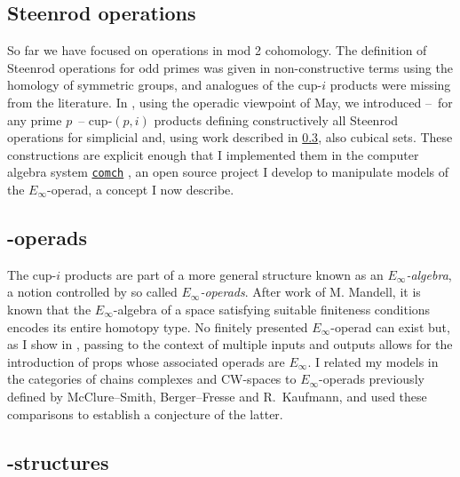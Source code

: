 \subsection{Steenrod operations} \label{ss:may steenrod}

So far we have focused on operations in mod 2 cohomology.
The definition of Steenrod operations for odd primes was given in non-constructive terms using the homology of symmetric groups, and analogues of the cup-$i$ products were missing from the literature.
In \cite{medina2021may_st}, using the operadic viewpoint of May, we introduced --~for any prime $p$~-- cup-$(p,i)$ products defining constructively all Steenrod operations for simplicial and, using work described in \cref{ss:e-infty structures}, also cubical sets.
These constructions are explicit enough that I implemented them in the computer algebra system \href{https://comch.readthedocs.io/en/latest/}{\texttt{comch}} \cite{medina2021comch}, an open source project I develop to manipulate models of the $E_\infty$-operad, a concept I now describe.

\subsection{\pdfEinfty-operads}

The cup-$i$ products are part of a more general structure known as an \textit{$E_\infty$-algebra}, a notion controlled by so called \textit{$E_\infty$-operads}.
After work of M. Mandell, it is known that the $E_\infty$-algebra of a space satisfying suitable finiteness conditions encodes its entire homotopy type.
No finitely presented $E_\infty$-operad can exist but, as I show in \cite{medina2020prop1,medina2021prop2}, passing to the context of multiple inputs and outputs allows for the introduction of props whose associated operads are $E_\infty$.
I related my models in the categories of chains complexes and CW-spaces to $E_\infty$-operads previously defined by McClure--Smith, Berger--Fresse and R.~Kaufmann, and used these comparisons to establish a conjecture of the latter.

\subsection{\pdfEinfty-structures} \label{ss:e-infty structures}

